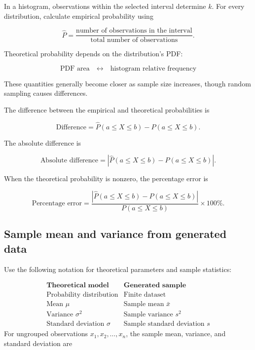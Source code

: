 In a histogram, observations within the selected interval determine $k$.
For every distribution, calculate empirical probability using

$$
\widehat{P}
=
\frac{\text{number of observations in the interval}}
{\text{total number of observations}}.
$$

Theoretical probability depends on the distribution's PDF:

$$
\boxed{
	\text{PDF area}
	\quad\longleftrightarrow\quad
	\text{histogram relative frequency}
}
$$

These quantities generally become closer as sample size increases, though
random sampling causes differences.

The difference between the empirical and theoretical probabilities is

$$
\text{Difference}
=
\widehat{P}(a\leq X\leq b)
-
P(a\leq X\leq b).
$$

The absolute difference is

$$
\text{Absolute difference}
=
\left|
\widehat{P}(a\leq X\leq b)
-
P(a\leq X\leq b)
\right|.
$$

When the theoretical probability is nonzero, the percentage error is

$$
\text{Percentage error}
=
\frac{
	\left|
	\widehat{P}(a\leq X\leq b)
	-
	P(a\leq X\leq b)
	\right|
}{
	P(a\leq X\leq b)
}
\times100\%.
$$


\subsection{Sample mean and variance from generated data}
\label{sec:c6-intro-sample-mean-variance}

Use the following notation for theoretical parameters and sample statistics:

$$
\boxed{
	\begin{array}{c|c}
		\textbf{Theoretical model} & \textbf{Generated sample} \\ \hline
		\text{Probability distribution} & \text{Finite dataset}\\
		\text{Mean } \mu & \text{Sample mean } \bar{x}\\
		\text{Variance } \sigma^2 & \text{Sample variance }s^2\\
		\text{Standard deviation } \sigma & \text{Sample standard deviation }s
\end{array}}
$$
For ungrouped observations $x_1,x_2,\ldots,x_n$, the sample mean, variance,
and standard deviation are

